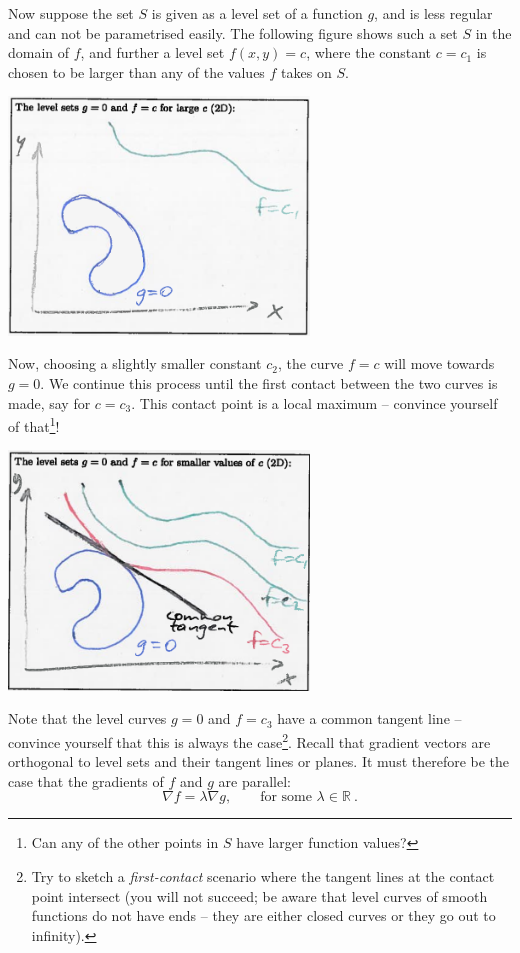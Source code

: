 \begin{remark}
Now suppose the set $S$ is given as a level set of a function $g$, and is less regular and can not be parametrised easily. The following figure shows such a set $S$ in the domain of $f$, and further a level set $f(x,y)=c$, where the constant $c=c_1$ is chosen to be larger than any of the values $f$ takes on $S$.
\begin{center}
	\includegraphics[width=0.6\textwidth]{./Figures/f312.png}
\end{center}
Now, choosing a slightly smaller constant $c_2$, the curve $f=c$ will move towards $g=0$. We continue this process until the first contact between the two curves is made, say for $c=c_3$. This contact point is a local maximum -- convince yourself of that\footnote{Can any of the other points in $S$ have larger function values?}!
\begin{center}
	\includegraphics[width=0.6\textwidth]{./Figures/f313.png}
\end{center}
Note that the level curves $g=0$ and $f=c_3$ have a common tangent line -- convince yourself that this is always the case\footnote{Try to sketch a \emph{first-contact} scenario where the tangent lines at the contact point intersect (you will not succeed; be aware that level curves of smooth functions do not have ends -- they are either closed curves or they go out to infinity).}. Recall that gradient vectors are orthogonal to level sets and their tangent lines or planes. It must therefore be the case that the gradients of $f$ and $g$ are parallel:
\[ \nabla f = \lambda \nabla g, \qquad \text{for some~} \lambda \in \mathbb{R} \:. \]
\end{remark}

